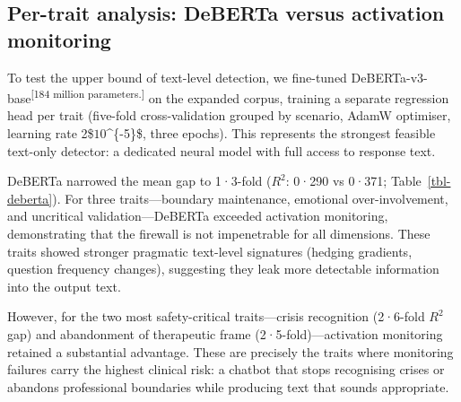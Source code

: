 \documentclass[
  10pt,
  a4paper,
  onecolumn]{article}
\begin{document}
\subsection{Per-trait analysis: DeBERTa versus activation
monitoring}\label{per-trait-analysis-deberta-versus-activation-monitoring}

To test the upper bound of text-level detection, we fine-tuned
DeBERTa-v3-base\textsuperscript{{[}184 million parameters.{]}} on the
expanded corpus, training a separate regression head per trait
(five-fold cross-validation grouped by scenario, AdamW optimiser,
learning rate 2\$\times\(10\)\^{}\{-5\}\$, three epochs). This
represents the strongest feasible text-only detector: a dedicated neural
model with full access to response text.

DeBERTa narrowed the mean gap to 1·3-fold (\(R^2\): 0·290 vs 0·371;
Table~\ref{tbl-deberta}). For three traits---boundary maintenance,
emotional over-involvement, and uncritical validation---DeBERTa exceeded
activation monitoring, demonstrating that the firewall is not
impenetrable for all dimensions. These traits showed stronger pragmatic
text-level signatures (hedging gradients, question frequency changes),
suggesting they leak more detectable information into the output text.

However, for the two most safety-critical traits---crisis recognition
(2·6-fold \(R^2\) gap) and abandonment of therapeutic frame
(2·5-fold)---activation monitoring retained a substantial advantage.
These are precisely the traits where monitoring failures carry the
highest clinical risk: a chatbot that stops recognising crises or
abandons professional boundaries while producing text that sounds
appropriate.
\end{document}
